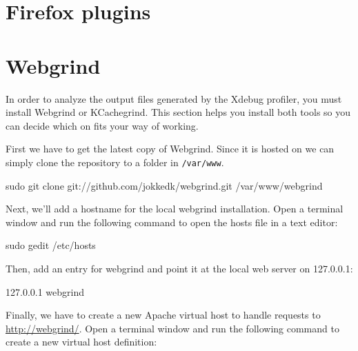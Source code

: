 \documentclass[draft,ebook,10pt,twoside,openright]{memoir}
\begin{document}


\section{Firefox plugins}


\section{Webgrind}

In order to analyze the output files generated by the Xdebug profiler, you must install Webgrind or KCachegrind. This section helps you install both tools so you can decide which on fits your way of working.

First we have to get the latest copy of Webgrind. Since it is hosted on  we can simply clone the repository to a folder in \verb!/var/www!.

\begin{squashboxcommand}
sudo git clone git://github.com/jokkedk/webgrind.git /var/www/webgrind
\end{squashboxcommand}

Next, we’ll add a hostname for the local webgrind installation. Open a terminal window and run the following command to open the hosts file in a text editor:

\begin{squashboxcommand}
sudo gedit /etc/hosts
\end{squashboxcommand}

Then, add an entry for webgrind and point it at the local web server on 127.0.0.1:

\begin{squashboxoutput}
127.0.0.1   webgrind
\end{squashboxoutput}

Finally, we have to create a new Apache virtual host to handle requests to \url{http://webgrind/}. Open a terminal window and run the following command to create a new virtual host definition:
\end{document}
